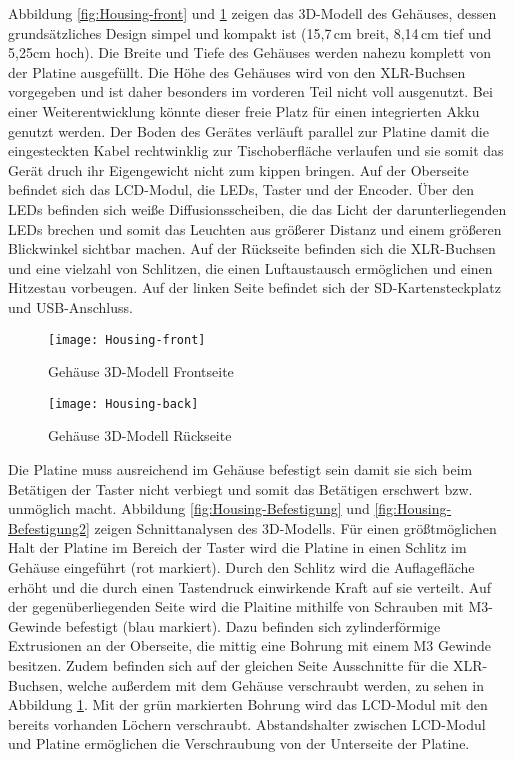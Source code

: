 Abbildung \ref{fig:Housing-front} und \ref{fig:Housing-back} zeigen das 3D-Modell des Gehäuses, dessen grundsätzliches Design simpel und kompakt ist (15,7\,cm breit, 8,14\,cm tief und 5,25cm hoch). Die Breite und Tiefe des Gehäuses werden nahezu komplett von der Platine ausgefüllt. Die Höhe des Gehäuses wird von den XLR-Buchsen vorgegeben und ist daher besonders im vorderen Teil nicht voll ausgenutzt. Bei einer Weiterentwicklung könnte dieser freie Platz für einen integrierten Akku genutzt werden. Der Boden des Gerätes verläuft parallel zur Platine damit die eingesteckten Kabel rechtwinklig zur Tischoberfläche verlaufen und sie somit das Gerät druch ihr Eigengewicht nicht zum kippen bringen. Auf der Oberseite befindet sich das LCD-Modul, die LEDs, Taster und der Encoder. Über den LEDs befinden sich weiße Diffusionsscheiben, die das Licht der darunterliegenden LEDs brechen und somit das Leuchten aus größerer Distanz und einem größeren Blickwinkel sichtbar machen. Auf der Rückseite befinden sich die XLR-Buchsen und eine vielzahl von Schlitzen, die einen Luftaustausch ermöglichen und einen Hitzestau vorbeugen. Auf der linken Seite befindet sich der SD-Kartensteckplatz und USB-Anschluss.
\begin{figure}[h]
	\begin{minipage}{.45\linewidth}
		\centering
		\texttt{[image: Housing-front]}
		\caption{Gehäuse 3D-Modell Frontseite}
		\label{fig:Housing-front}
	\end{minipage}
	\hfill
	\begin{minipage}{.45\linewidth}
		\centering
		\texttt{[image: Housing-back]}
		\caption{Gehäuse 3D-Modell Rückseite}
		\label{fig:Housing-back}
	\end{minipage}
\end{figure}
Die Platine muss ausreichend im Gehäuse befestigt sein damit sie sich beim Betätigen der Taster nicht verbiegt und somit das Betätigen erschwert bzw. unmöglich macht. Abbildung \ref{fig:Housing-Befestigung} und \ref{fig:Housing-Befestigung2} zeigen Schnittanalysen des 3D-Modells. Für einen größtmöglichen Halt der Platine im Bereich der Taster wird die Platine in einen Schlitz im Gehäuse eingeführt (rot markiert). Durch den Schlitz wird die Auflagefläche erhöht und die durch einen Tastendruck einwirkende Kraft auf sie verteilt. Auf der gegenüberliegenden Seite wird die Plaitine mithilfe von Schrauben mit M3-Gewinde befestigt (blau markiert). Dazu befinden sich zylinderförmige Extrusionen an der Oberseite, die mittig eine Bohrung mit einem M3 Gewinde besitzen. Zudem befinden sich auf der gleichen Seite Ausschnitte für die XLR-Buchsen, welche außerdem mit dem Gehäuse verschraubt werden, zu sehen in Abbildung \ref{fig:Housing-back}. Mit der grün markierten Bohrung wird das LCD-Modul mit den bereits vorhanden Löchern verschraubt. Abstandshalter zwischen LCD-Modul und Platine ermöglichen die Verschraubung von der Unterseite der Platine.

